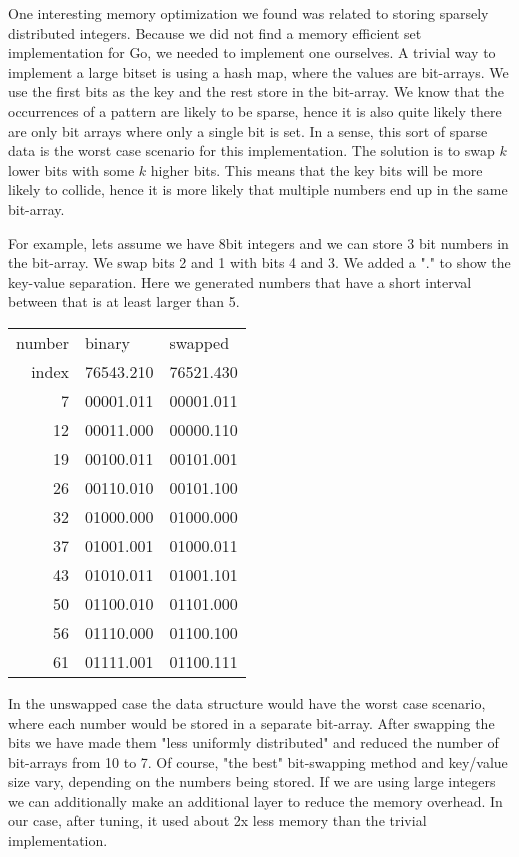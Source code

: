 One interesting memory optimization we found was related to storing sparsely distributed integers. Because we did not find a memory efficient set implementation for Go, we needed to implement one ourselves. A trivial way to implement a large bitset is using a hash map, where the values are bit-arrays. We use the first bits as the key and the rest store in the bit-array. We know that the occurrences of a pattern are likely to be sparse, hence it is also quite likely there are only bit arrays where only a single bit is set. In a sense, this sort of sparse data is the worst case scenario for this implementation. The solution is to swap $k$ lower bits with some $k$ higher bits. This means that the key bits will be more likely to collide, hence it is more likely that multiple numbers end up in the same bit-array.

For example, lets assume we have 8bit integers and we can store 3 bit numbers in the bit-array. We swap bits 2 and 1 with bits 4 and 3. We added a "." to show the key-value separation. Here we generated numbers that have a short interval between that is at least larger than 5.

\begin{center}
    \small
    \begin{tabular}{ | r | l | l | }
    \hline
    number & binary & swapped \\
    index & 76543.210 & 76521.430 \\
    \hline
     7 & 00001.011 & 00001.011 \\
    12 & 00011.000 & 00000.110 \\
    19 & 00100.011 & 00101.001 \\
    26 & 00110.010 & 00101.100 \\
    32 & 01000.000 & 01000.000 \\
    37 & 01001.001 & 01000.011 \\
    43 & 01010.011 & 01001.101 \\
    50 & 01100.010 & 01101.000 \\
    56 & 01110.000 & 01100.100 \\
    61 & 01111.001 & 01100.111 \\
    \hline
    \end{tabular}    
\end{center}

In the unswapped case the data structure would have the worst case scenario, where each number would be stored in a separate bit-array. After swapping the bits we have made them "less uniformly distributed" and reduced the number of bit-arrays from 10 to 7. Of course, "the best" bit-swapping method and key/value size vary, depending on the numbers being stored. If we are using large integers we can additionally make an additional layer to reduce the memory overhead. In our case, after tuning, it used about 2x less memory than the trivial implementation.

